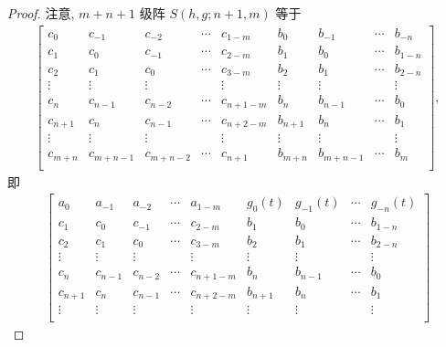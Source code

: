 \documentclass[../libro.tex]{subfiles}
\begin{document}
\begin{proof}
    注意, \(m + n + 1\) 级阵 \(S(h, g; n+1, m)\) 等于
    \begin{align*}
        \begin{bmatrix}
            c_{0}   & c_{-1}    & c_{-2}    & \cdots & c_{1-m}   & b_{0}   & b_{-1}    & \cdots & b_{-n}  \\
            c_{1}   & c_{0}     & c_{-1}    & \cdots & c_{2-m}   & b_{1}   & b_{0}     & \cdots & b_{1-n} \\
            c_{2}   & c_{1}     & c_{0}     & \cdots & c_{3-m}   & b_{2}   & b_{1}     & \cdots & b_{2-n} \\
            \vdots  & \vdots    & \vdots    & {}     & \vdots    & \vdots  & \vdots    & {}     & \vdots  \\
            c_{n}   & c_{n-1}   & c_{n-2}   & \cdots & c_{n+1-m} & b_{n}   & b_{n-1}   & \cdots & b_{0}   \\
            c_{n+1} & c_{n}     & c_{n-1}   & \cdots & c_{n+2-m} & b_{n+1} & b_{n}     & \cdots & b_{1}   \\
            \vdots  & \vdots    & \vdots    & {}     & \vdots    & \vdots  & \vdots    & {}     & \vdots  \\
            c_{m+n} & c_{m+n-1} & c_{m+n-2} & \cdots & c_{n+1}   & b_{m+n} & b_{m+n-1} & \cdots & b_{m}   \\
        \end{bmatrix},
    \end{align*}
    即
    \begin{align*}
        \begin{bmatrix}
            a_{0}   & a_{-1}    & a_{-2}    & \cdots & a_{1-m}   & g_{0} (t) & g_{-1} (t) & \cdots & g_{-n} (t) \\
            c_{1}   & c_{0}     & c_{-1}    & \cdots & c_{2-m}   & b_{1}     & b_{0}      & \cdots & b_{1-n}    \\
            c_{2}   & c_{1}     & c_{0}     & \cdots & c_{3-m}   & b_{2}     & b_{1}      & \cdots & b_{2-n}    \\
            \vdots  & \vdots    & \vdots    & {}     & \vdots    & \vdots    & \vdots     & {}     & \vdots     \\
            c_{n}   & c_{n-1}   & c_{n-2}   & \cdots & c_{n+1-m} & b_{n}     & b_{n-1}    & \cdots & b_{0}      \\
            c_{n+1} & c_{n}     & c_{n-1}   & \cdots & c_{n+2-m} & b_{n+1}   & b_{n}      & \cdots & b_{1}      \\
            \vdots  & \vdots    & \vdots    & {}     & \vdots    & \vdots    & \vdots     & {}     & \vdots     \\

\end{bmatrix}
\end{align*}
\end{proof}
\end{document}
